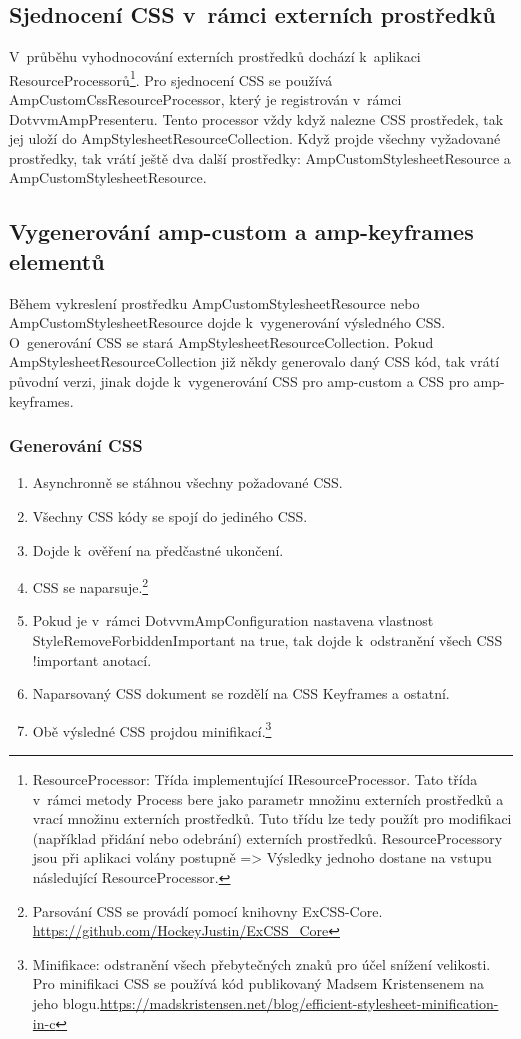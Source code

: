 \subsection*{Sjednocení CSS v~rámci externích prostředků}
V~průběhu vyhodnocování externích prostředků dochází k~aplikaci ResourceProcessorů\footnote{ResourceProcessor: Třída implementující IResourceProcessor. Tato třída v~rámci metody Process bere jako parametr množinu externích prostředků a vrací množinu externích prostředků. Tuto třídu lze tedy použít pro modifikaci (například přidání nebo odebrání) externích prostředků. ResourceProcessory jsou při aplikaci volány postupně => Výsledky jednoho dostane na vstupu následující ResourceProcessor.}. Pro sjednocení CSS se používá AmpCustomCssResourceProcessor, který je registrován v~rámci DotvvmAmpPresenteru. Tento processor vždy když nalezne CSS prostředek, tak jej uloží do AmpStylesheetResourceCollection. Když projde všechny vyžadované prostředky, tak vrátí ještě dva další prostředky: AmpCustomStylesheetResource a AmpCustomStylesheetResource.

\subsection*{Vygenerování amp-custom a amp-keyframes elementů}
Během vykreslení prostředku AmpCustomStylesheetResource nebo AmpCustomStylesheetResource dojde k~vygenerování výsledného CSS. O~generování CSS se stará AmpStylesheetResourceCollection. Pokud AmpStylesheetResourceCollection již někdy generovalo daný CSS kód, tak vrátí původní verzi, jinak dojde k~vygenerování CSS pro amp-custom a CSS  pro amp-keyframes.

\subsubsection*{Generování CSS}
\begin{enumerate}
  \setlength{\itemsep}{14pt}%
    \item Asynchronně se stáhnou všechny požadované CSS.
    \item Všechny CSS kódy se spojí do jediného CSS.
    \item Dojde k~ověření na předčastné ukončení.
    \item CSS se naparsuje.\footnote{Parsování CSS se provádí pomocí knihovny ExCSS-Core. \newline \url{https://github.com/HockeyJustin/ExCSS_Core}}
    \item Pokud je v~rámci DotvvmAmpConfiguration nastavena vlastnost StyleRemoveForbiddenImportant na true, tak dojde k~odstranění všech CSS !important anotací. 
    \item Naparsovaný CSS dokument se rozdělí na CSS Keyframes a ostatní.
    \item Obě výsledné CSS projdou minifikací.\footnote{Minifikace: odstranění všech přebytečných znaků pro účel snížení velikosti. \newline Pro minifikaci CSS se používá kód publikovaný Madsem Kristensenem na jeho blogu.\newline \url{https://madskristensen.net/blog/efficient-stylesheet-minification-in-c}}
\end{enumerate}

